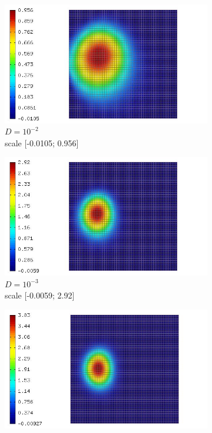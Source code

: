 \documentclass[mathserif]{beamer}
\begin{document}
\begin{frame}
\begin{figure}[H]
\begin{subfigure}[H]{0.02\textwidth}
	\end{subfigure}
	\begin{subfigure}[H]{0.3\textwidth}
		\centering
		\includegraphics[width=.9\textwidth, trim = 65mm 0mm 0mm 0mm, clip]{images/timedep-multiscale/stability/eps=001_402.jpg}
		\vspace{-3mm}
		\caption{$D = 10^{-2}$\\\vspace{-2mm}scale [-0.0105; 0.956]}
	\end{subfigure}
	\begin{subfigure}[H]{0.3\textwidth}
		\centering
		\includegraphics[width=.9\textwidth, trim = 65mm 0mm 0mm 0mm, clip]{images/timedep-multiscale/stability/eps=0001_402.jpg}
		\vspace{-3mm}
		\caption{$D = 10^{-3}$\\\vspace{-2mm}scale [-0.0059; 2.92]}
	\end{subfigure}
	\begin{subfigure}[H]{0.3\textwidth}
		\centering
		\includegraphics[width=.9\textwidth, trim = 65mm 0mm 0mm 0mm, clip]{images/timedep-multiscale/stability/eps=0_402.jpg}

\end{subfigure}
\end{figure}
\end{frame}
\end{document}
